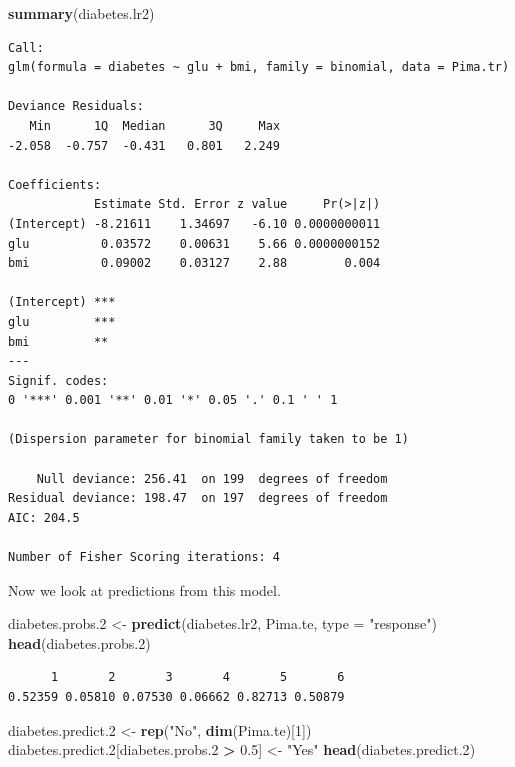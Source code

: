 \documentclass[
]{krantz}
\makeatletter
\newenvironment{Shaded}{\begin{snugshade}}{\end{snugshade}}
\newcommand{\DataTypeTok}[1]{\textcolor[rgb]{0.27,0.27,0.27}{#1}}
\newcommand{\DecValTok}[1]{\textcolor[rgb]{0.06,0.06,0.06}{#1}}
\newcommand{\FloatTok}[1]{\textcolor[rgb]{0.06,0.06,0.06}{#1}}
\newcommand{\KeywordTok}[1]{\textcolor[rgb]{0.27,0.27,0.27}{\textbf{#1}}}
\newcommand{\NormalTok}[1]{#1}
\newcommand{\OperatorTok}[1]{\textcolor[rgb]{0.43,0.43,0.43}{\textbf{#1}}}
\newcommand{\StringTok}[1]{\textcolor[rgb]{0.5,0.5,0.5}{#1}}
\newenvironment{kframe}{%
\medskip{}
\setlength{\fboxsep}{.8em}
 \def\at@end@of@kframe{}%
 \ifinner\ifhmode%
  \def\at@end@of@kframe{\end{minipage}}%
  \begin{minipage}{\columnwidth}%
 \fi\fi%
 \def\FrameCommand##1{\hskip\@totalleftmargin \hskip-\fboxsep
 \colorbox{shadecolor}{##1}\hskip-\fboxsep
     \hskip-\linewidth \hskip-\@totalleftmargin \hskip\columnwidth}%
 \MakeFramed {\advance\hsize-\width
   \@totalleftmargin\z@ \linewidth\hsize
   \@setminipage}}%
 {\par\unskip\endMakeFramed%
 \at@end@of@kframe}
\renewenvironment{Shaded}{\begin{kframe}}{\end{kframe}}
\makeatother
\begin{document}
\begin{Shaded}
\begin{Highlighting}[]
\KeywordTok{summary}\NormalTok{(diabetes.lr2)}
\end{Highlighting}
\end{Shaded}

\begin{verbatim}
Call:
glm(formula = diabetes ~ glu + bmi, family = binomial, data = Pima.tr)

Deviance Residuals: 
   Min      1Q  Median      3Q     Max  
-2.058  -0.757  -0.431   0.801   2.249  

Coefficients:
            Estimate Std. Error z value     Pr(>|z|)
(Intercept) -8.21611    1.34697   -6.10 0.0000000011
glu          0.03572    0.00631    5.66 0.0000000152
bmi          0.09002    0.03127    2.88        0.004
               
(Intercept) ***
glu         ***
bmi         ** 
---
Signif. codes:  
0 '***' 0.001 '**' 0.01 '*' 0.05 '.' 0.1 ' ' 1

(Dispersion parameter for binomial family taken to be 1)

    Null deviance: 256.41  on 199  degrees of freedom
Residual deviance: 198.47  on 197  degrees of freedom
AIC: 204.5

Number of Fisher Scoring iterations: 4
\end{verbatim}

Now we look at predictions from this model.

\begin{Shaded}
\begin{Highlighting}[]
\NormalTok{diabetes.probs}\FloatTok{.2}\NormalTok{ \textless{}{-}}\StringTok{ }\KeywordTok{predict}\NormalTok{(diabetes.lr2, Pima.te, }\DataTypeTok{type =} \StringTok{"response"}\NormalTok{)}
\KeywordTok{head}\NormalTok{(diabetes.probs}\FloatTok{.2}\NormalTok{)}
\end{Highlighting}
\end{Shaded}

\begin{verbatim}
      1       2       3       4       5       6 
0.52359 0.05810 0.07530 0.06662 0.82713 0.50879 
\end{verbatim}

\begin{Shaded}
\begin{Highlighting}[]
\NormalTok{diabetes.predict}\FloatTok{.2}\NormalTok{ \textless{}{-}}\StringTok{ }\KeywordTok{rep}\NormalTok{(}\StringTok{"No"}\NormalTok{, }\KeywordTok{dim}\NormalTok{(Pima.te)[}\DecValTok{1}\NormalTok{])}
\NormalTok{diabetes.predict}\FloatTok{.2}\NormalTok{[diabetes.probs}\FloatTok{.2} \OperatorTok{\textgreater{}}\StringTok{ }\FloatTok{0.5}\NormalTok{] \textless{}{-}}\StringTok{ "Yes"}
\KeywordTok{head}\NormalTok{(diabetes.predict}\FloatTok{.2}\NormalTok{)}
\end{Highlighting}
\end{Shaded}
\end{document}
